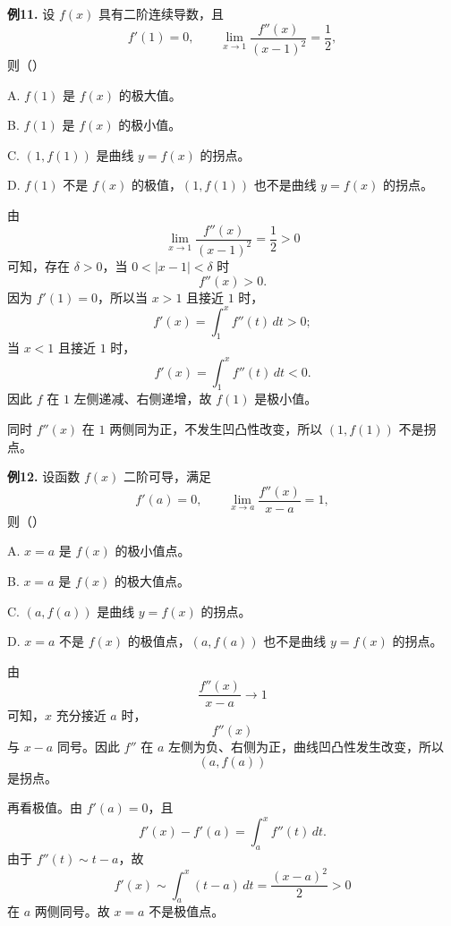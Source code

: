 \begin{problemblock}
\textbf{例11.} 设 \(f(x)\) 具有二阶连续导数，且
\[
f'(1)=0,\qquad
\lim_{x\to1}\frac{f''(x)}{(x-1)^2}=\frac12,
\]
则（\quad）

A. \(f(1)\) 是 \(f(x)\) 的极大值。

B. \(f(1)\) 是 \(f(x)\) 的极小值。

C. \((1,f(1))\) 是曲线 \(y=f(x)\) 的拐点。

D. \(f(1)\) 不是 \(f(x)\) 的极值，\((1,f(1))\) 也不是曲线 \(y=f(x)\) 的拐点。
\end{problemblock}
\begin{solutionblock}
由
\[
\lim_{x\to1}\frac{f''(x)}{(x-1)^2}=\frac12>0
\]
可知，存在 \(\delta>0\)，当 \(0<|x-1|<\delta\) 时
\[
f''(x)>0.
\]
因为 \(f'(1)=0\)，所以当 \(x>1\) 且接近 \(1\) 时，
\[
f'(x)=\int_1^x f''(t)\,dt>0;
\]
当 \(x<1\) 且接近 \(1\) 时，
\[
f'(x)=\int_1^x f''(t)\,dt<0.
\]
因此 \(f\) 在 \(1\) 左侧递减、右侧递增，故 \(f(1)\) 是极小值。

同时 \(f''(x)\) 在 \(1\) 两侧同为正，不发生凹凸性改变，所以 \((1,f(1))\) 不是拐点。
\end{solutionblock}

\begin{problemblock}
\textbf{例12.} 设函数 \(f(x)\) 二阶可导，满足
\[
f'(a)=0,\qquad
\lim_{x\to a}\frac{f''(x)}{x-a}=1,
\]
则（\quad）

A. \(x=a\) 是 \(f(x)\) 的极小值点。

B. \(x=a\) 是 \(f(x)\) 的极大值点。

C. \((a,f(a))\) 是曲线 \(y=f(x)\) 的拐点。

D. \(x=a\) 不是 \(f(x)\) 的极值点，\((a,f(a))\) 也不是曲线 \(y=f(x)\) 的拐点。
\end{problemblock}
\begin{solutionblock}
由
\[
\frac{f''(x)}{x-a}\to1
\]
可知，\(x\) 充分接近 \(a\) 时，
\[
f''(x)
\]
与 \(x-a\) 同号。因此 \(f''\) 在 \(a\) 左侧为负、右侧为正，曲线凹凸性发生改变，所以
\[
(a,f(a))
\]
是拐点。

再看极值。由 \(f'(a)=0\)，且
\[
f'(x)-f'(a)=\int_a^x f''(t)\,dt.
\]
由于 \(f''(t)\sim t-a\)，故
\[
f'(x)\sim \int_a^x (t-a)\,dt=\frac{(x-a)^2}{2}>0
\]
在 \(a\) 两侧同号。故 \(x=a\) 不是极值点。
\end{solutionblock}

